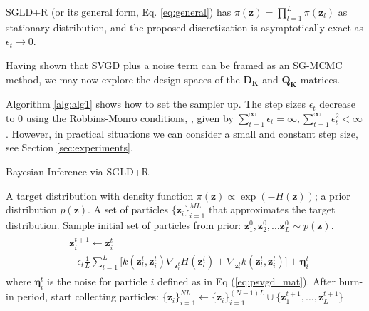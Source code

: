 \begin{proposition}
SGLD+R (or its general form, Eq. \eqref{eq:general}) has $\pi(\bm{z}) = \prod_{l=1}^L \pi(\bm{z}_l)$ as stationary distribution, and the proposed discretization is asymptotically exact as $\epsilon_t \rightarrow 0$.
\end{proposition}
\noindent Having shown that SVGD plus a noise term can be framed as an SG-MCMC method, we may now explore the design spaces of the $\mathbf{D_K}$ and $\mathbf{Q_K}$ matrices. %

Algorithm \ref{alg:alg1} shows how to set the sampler up. The step sizes $\epsilon_t$ decrease to $0$ using the Robbins-Monro conditions, \cite{robbins1951stochastic}, given by $\sum_{t=1}^\infty \epsilon_t = \infty, \sum_{t=1}^\infty \epsilon_t^2 < \infty$. However, in practical situations we can consider a small and constant step size, see Section \ref{sec:experiments}. 

\begin{algorithm}[!h] %
\caption{Bayesian Inference via SGLD+R}  
\label{alg:alg1}
\begin{algorithmic}
 A target distribution with density function $\pi(\bm{z}) \propto \exp (-H(\bm{z}))$; a prior distribution $p(\bm{z})$. 
 A set of particles $\{\bm{z}_i\}_{i=1}^{ML}$ that approximates the target distribution.  
\State Sample initial set of particles from prior: $\bm{z}_1^0, \bm{z}_2^0, \ldots \bm{z}_L^0 \sim p(\bm{z})$.
\State 
\begin{align} \label{eq:psvgd_alg}
\begin{split}
&\bm{z}_i^{t+1}  \gets  \bm{z}_i^t \\& - \epsilon_t \frac{1}{L}\sum_{l=1}^L\big[  k(\bm{z}_l^t, \bm{z}_i^t)  \nabla_{\bm{z}_l^t} H(\bm{z}_l^t) + \nabla_{\bm{z}_l^t} k(\bm{z}_l^t, \bm{z}_i^t)\big] + \bm{\eta}_i^t
\end{split}
\end{align}
\State where $\bm{\eta}_i^t$ is the noise for particle $i$ defined as in Eq (\ref{eq:psvgd_mat}).
\State After  burn-in period, start collecting particles: $ \{\bm{z}_i\}_{i=1}^{NL} \gets \{\bm{z}_i\}_{i=1}^{(N-1)L} \cup \{ \bm{z}_1^{t+1}, \ldots,  \bm{z}_L^{t+1} \} $ 
\EndFor
\end{algorithmic}
\end{algorithm}

